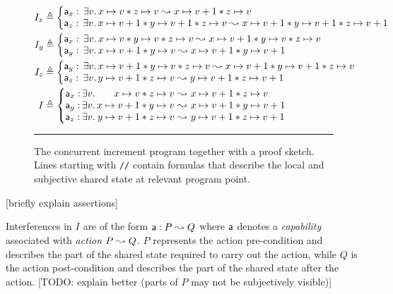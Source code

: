 \begin{figure*}
\begin{align*}
  I_x &\eqdef \left\{
  \begin{array}{@{}l@{}}
    \token a_x:\, \exsts{v} \cell{x}{v} * \cell{z}{v}  \swap  \cell{x}{v+1} * \cell{z}{v}\\
    \token a_z:\, \exsts{v} \cell{x}{v+1} * \cell{y}{v+1} * \cell{z}{v}\swap \cell{x}{v+1} * \cell{y}{v+1} * \cell{z}{v+1}
  \end{array}
  \right.\\
  I_y &\eqdef \left\{
  \begin{array}{@{}l@{}}
    \token a_x:\, \exsts{v} \cell{x}{v} * \cell{y}{v} * \cell{z}{v}  \swap  \cell{x}{v+1} * \cell{y}{v} * \cell{z}{v}\\
    \token a_y:\, \exsts{v} \cell{x}{v+1} *  \cell{y}{v}\swap \cell{x}{v+1} * \cell{y}{v+1}
  \end{array}
  \right.\\
  I_z &\eqdef \left\{
  \begin{array}{@{}l@{}}
    \token a_y:\, \exsts{v} \cell{x}{v+1} * \cell{y}{v} * \cell{z}{v}  \swap \cell{x}{v+1} * \cell{y}{v+1} * \cell{z}{v}\\
    \token a_z:\, \exsts{v} \cell{y}{v+1} *  \cell{z}{v}\swap \cell{y}{v+1} * \cell{z}{v+1}
  \end{array}
  \right.\\
  I &\eqdef \left\{
  \begin{array}{@{}l@{\,}l@{}r@{\ }c@{\ }l@{}}
    \token a_x: & \exsts{v} & \cell{x}{v} * \cell{z}{v} & \swap & \cell{x}{v+1} * \cell{z}{v}\\
    \token a_y: & \exsts{v} & \cell{x}{v+1} * \cell{y}{v} & \swap & \cell{x}{v+1} * \cell{y}{v+1}\\
    \token a_z: & \exsts{v} & \cell{y}{v+1} * \cell{z}{v} & \swap & \cell{y}{v+1} * \cell{z}{v+1}
  \end{array}\right.
\end{align*}

\hrule\vspace{5pt}
\caption{The concurrent increment program together with a \colosl proof
  sketch. Lines starting with \lstinline{//} contain formulas that describe
  the local and subjective shared state at relevant program point.}
\label{fig:concurrentInc}
\end{figure*}

[briefly explain assertions]

Interferences in $I$ are of the form $\mathsf{a}: P \mathrel{\leadsto} Q$ where
$\mathsf{a}$ denotes a \emph{capability} associated with \emph{action}
$P \mathrel{\leadsto} Q$. $P$ represents the action pre-condition and describes the
part of the shared state required to carry out the action, while $Q$
is the action post-condition and describes the part of the shared
state after the action. [TODO: explain better (parts of $P$ may not be
  subjectively visible)]

